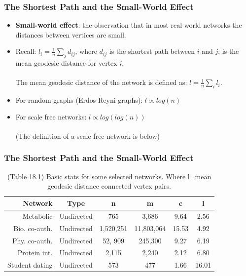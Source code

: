 \documentclass[smaller]{beamer}
\begin{document}
\begin{frame} 
   \frametitle{The Shortest Path and the Small-World Effect} 
   \begin{itemize}
   \item {\bf Small-world effect}: the observation that in most real world networks the distances between vertices are
   small.\\
   \item Recall: $l_i = \frac{1}{n}\sum_{j} d_{ij}$, where $d_{ij}$ is the shortest path between $i$ and $j$; is the mean
   geodesic distance for vertex $i$.\\
   ${}_{}$\\
   The mean geodesic distance of the network is defined as: $l=\frac{1}{n} \sum_i l_i$.
   \item For random graphs (Erdos-Reyni graphs): $l \propto log(n)$
   \item For scale free networks: $l \propto log(log(n))$\\
   ${}_{}$\\
   (The definition of a scale-free network is below)
   \end{itemize}
\end{frame}


\begin{frame} 
\frametitle{The Shortest Path and the Small-World Effect} 

\begin{table}[ht]
\caption{(Table 18.1) Basic stats for some selected networks. Where l=mean geodesic distance connected vertex pairs.} 
\centering 
\begin{tabular}{r c c c c c}
\hline
Network & Type & n & m & c & l \\  \hline
Metabolic & Undirected & 765 & 3,686 & 9.64 & 2.56  \\
Bio. co-auth. & Undirected & 1,520,251 & 11,803,064 & 15.53 & 4.92 \\
Phy. co-auth. & Undirected & 52, 909 & 245,300  & 9.27 & 6.19 \\
Protein int.& Undirected & 2,115 & 2,240 & 2.12 & 6.80 \\
Student dating & Undirected & 573 & 477 & 1.66 & 16.01 \\
\end{tabular}
\end{table}

\end{frame}
\end{document}
